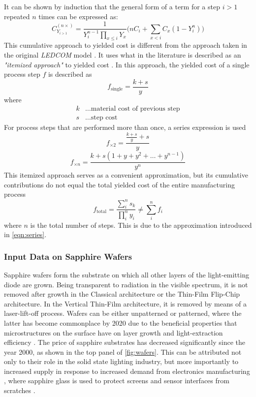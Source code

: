 \documentclass[parskip=full]{article}
\begin{document}
%
It can be shown by induction that the general form of a term for a step $i>1$ repeated $n$ times can be expressed as:
%
\begin{equation}
\label{eqn:yielded_cost}
    C_{Y_{i>1}}^{(n \times)} = \frac{1}{Y_i^{n-1} \prod_{x \leq i} Y_x} \bigg( nC_i + \sum_{x < i} C_x (1-Y_i^n) \bigg)
\end{equation}
%
This cumulative approach to yielded cost is different from the approach taken in the original \textit{LEDCOM} model \cite{ledcomv2}. It uses what in the literature is described as an \textit{"itemized approach"} to yielded cost \cite{becker2001use}. In this approach, the yielded cost of a single process step $f$ is described as
%
\begin{equation}
    f_\text{single} = \frac{k+s}{y}
\end{equation}
%
where
%
\begin{align*}
    k &\dots \text{material cost of previous step} \\
    s &\dots \text{step cost}
\end{align*}
%
For process steps that are performed more than once, a series expression is used
%
\begin{equation}
    f_{\times 2} =  \frac{\frac{k+s}{y}+s}{y}
\end{equation}
\begin{equation}
\label{eqn:series}
    f_{\times n} = \frac{k + s(1+y+y^2+ \dots + y^{n-1})}{y^n}
\end{equation}
%
This itemized approach serves as a convenient approximation, but its cumulative contributions do not equal the total yielded cost of the entire manufacturing process
%
\begin{equation}
    f_\text{total} = \frac{\sum_i^n s_k}{\prod_i^n y_i} \neq \sum_i^n f_i
\end{equation}
%
where $n$ is the total number of steps. This is due to the approximation introduced in \cref{eqn:series}.

\subsubsection{Input Data on Sapphire Wafers}

Sapphire wafers form the substrate on which all other layers of the light-emitting diode are grown. Being transparent to radiation in the visible spectrum, it is not removed after growth in the Classical architecture or the Thin-Film Flip-Chip architecture. In the Vertical Thin-Film architecture, it is removed by means of a laser-lift-off process. Wafers can be either unpatterned or patterned, where the latter has become commonplace by 2020 due to the beneficial properties that microstructures on the surface have on layer growth \cite{wuu2009defect} and light-extraction efficiency \cite{lee2006enhancing}. The price of sapphire substrates has decreased significantly since the year 2000, as shown in the top panel of \cref{fig:wafers}. This can be attributed not only to their role in the solid state lighting industry, but more importantly to increased supply in response to increased demand from electronics manufacturing \cite{yole2015sapphire}, where sapphire glass is used to protect screens and sensor interfaces from scratches \cite{khattak2016world}.
\end{document}
